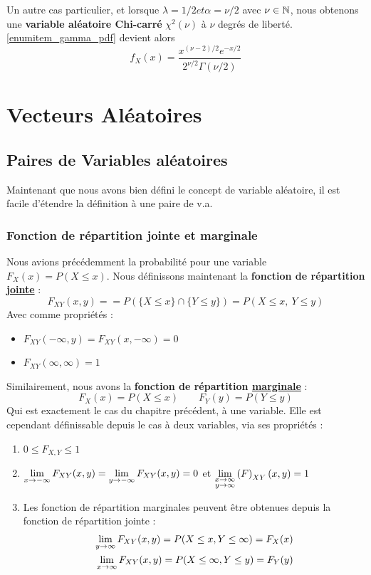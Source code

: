 \documentclass[11pt,a4paper]{article}
\numberwithin{equation}{section}
\begin{document}
Un autre cas particulier, et lorsque $\lambda = 1/2 et \alpha = \nu/2$ avec $\nu \in \mathbb{N}$, nous obtenons une \textbf{variable aléatoire Chi-carré} $\chi^2(\nu)$ à $\nu$ degrés de liberté. \ref{enumitem_gamma_pdf} devient alors 
\begin{equation}
    f_X(x) = \frac{x^{(\nu-2)/2}e^{-x/2}}{2^{\nu/2}\Gamma(\nu/2)}
\end{equation}
\section{Vecteurs Aléatoires}
\subsection{Paires de Variables aléatoires}
Maintenant que nous avons bien défini le concept de variable aléatoire, il est facile d'étendre la définition à une paire de v.a.
\subsubsection{Fonction de répartition jointe et marginale}
Nous avions précédemment la probabilité pour une variable $F_X(x) = P(X \leq x)$. Nous définissons maintenant la \textbf{fonction de répartition \uline{jointe}} : 
 \[F_{XY}(x,y) = = P(\{X \leq x\} \cap \{Y \leq y\}) = P(X \leq x,\ Y \leq y)\]
Avec comme propriétés : 
\begin{itemize}
	\item $F_{XY}(-\infty,y) = F_{XY}(x,-\infty) = 0$
	\item $F_{XY}(\infty,\infty) = 1$
\end{itemize}
Similairement, nous avons la \textbf{fonction de répartition \uline{marginale}} : 
\[F_X(x) = P(X \leq x)\qquad F_Y(y) = P(Y \leq y)\]
Qui est exactement le cas du chapitre précédent, à une variable. Elle est cependant définissable depuis le cas à deux variables, via ses propriétés :
\begin{enumerate}[label=P\arabic*.]
    \item $0 \leq F_{X,Y} \leq 1$
    \item $\lim\limits_{x\to -\infty} F_{XY}(x,y) = \lim\limits_{y\to-\infty} F_{XY}(x,y) = 0$ et $\lim\limits_{\substack{x\to\infty \\ y\to\infty}}\left(F\right)_{XY}(x,y) = 1$
    \item Les fonction de répartition marginales peuvent être obtenues depuis la fonction de répartition jointe :
    \begin{align*}
        \lim\limits_{y\to\infty}F_{XY}(x,y) = P(X \leq x, Y \leq \infty) = F_X(x)\\
        \lim\limits_{x\to\infty}F_{XY}(x,y) = P(X \leq \infty, Y \leq y) = F_Y(y)\\
    \end{align*}
\end{enumerate}
\end{document}
